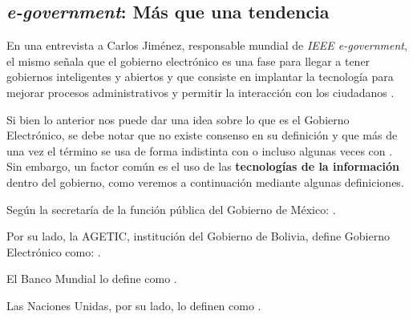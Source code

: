 \subsection{\textit{e-government}: Más que una tendencia}

En una entrevista a Carlos Jiménez, responsable mundial de \textit{IEEE e-government}, el mismo señala que 
el gobierno electrónico es una fase para llegar a tener gobiernos inteligentes y abiertos y que 
consiste en implantar la tecnología para mejorar procesos administrativos y permitir la interacción con los ciudadanos \cite{digitalGobiernoInteligenteEntrevista2015}.

Si bien lo anterior nos puede dar una idea sobre lo que es el Gobierno Electrónico, se debe notar que no existe consenso en su definición y que más de una vez el término se usa de forma indistinta con  o incluso algunas veces con .
Sin embargo, un factor común es el uso de las \textbf{tecnologías de la información} dentro del gobierno, como veremos a continuación mediante algunas definiciones.

Según la secretaría de la función pública del Gobierno de México: 
 \cite{publicaGobiernoDigitalElectronico}.

Por su lado, la AGETIC, institución del Gobierno de Bolivia, define Gobierno Electrónico como: 
 \cite{GobiernoElectronico}.

El Banco Mundial lo define como
.

Las Naciones Unidas, por su lado, lo definen como 
.

